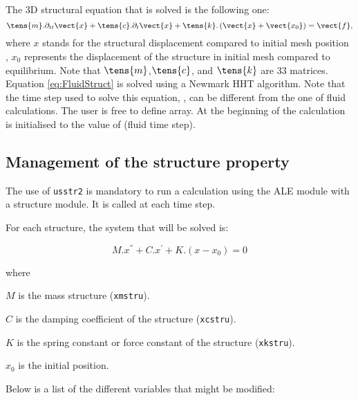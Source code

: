 The 3D structural equation that is solved is the following one:
\begin{equation}\label{eq:FluidStruct}
\displaystyle
\tens{m}.\partial_{tt}\vect{x}+\tens{c}.\partial_{t}\vect{x}+\tens{k}.\left(\vect{x}+\vect{x_0}\right)=\vect{f},
\end{equation}
where $x$ stands for the structural displacement compared to initial mesh position
 , $x_0$ represents
 the displacement of the structure in initial mesh compared to equilibrium.
Note that $\tens{m}$,$\tens{c}$, and $\tens{k}$ are 33 matrices.
Equation \eqref{eq:FluidStruct} is solved using a Newmark HHT algorithm.
Note that the time step used to solve this equation, , can be
 different from the one of fluid calculations. The user is free to define 
 array. At the beginning of the calculation  is initialised to the value of
  (fluid time step).

\subsection{Management of the structure property}

The use of \texttt{usstr2} is mandatory to run a calculation using the ALE
 module with a structure module. It is called at each time step.

For each structure, the system that will be solved is:

\begin{equation}
M.x^{''}+C.x^{'}+K.(x-x_{0}) = 0
\end{equation}

where

\begin{list}{-}{}
 \item $M$ is the mass structure (\texttt{xmstru}).
 \item $C$ is the damping coefficient of the structure (\texttt{xcstru}).
 \item $K$ is the spring constant or force constant of the structure (\texttt{xkstru}).
 \item $x_{0}$ is the initial position.
\end{list}

Below is a list of the different variables that might be modified:

